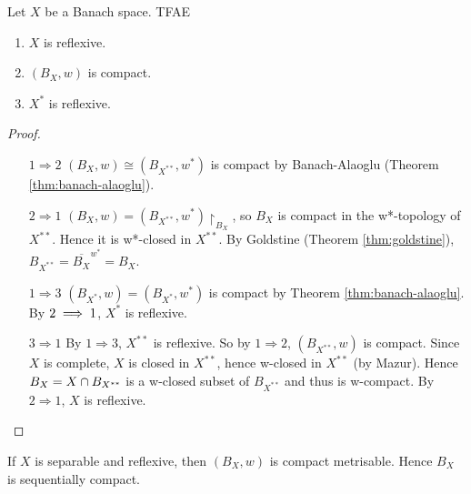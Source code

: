 \documentclass{article}
\begin{document}
\begin{nthm}
  Let $X$ be a Banach space. TFAE
  \begin{enumerate}
    \item $X$ is reflexive.
    \item $(B_X, w)$ is compact.
    \item $X^*$ is reflexive.
  \end{enumerate}
\end{nthm}
\begin{proof}~
  \begin{itemize}
    \item[$1 \Rightarrow 2$] $(B_X, w) \cong (B_{X^{**}}, w^*)$ is compact by Banach-Alaoglu (Theorem \ref{thm:banach-alaoglu}).
    \item[$2 \Rightarrow 1$] $(B_X, w) = (B_{X^{**}}, w^*)\restriction_{B_X}$, so $B_X$ is compact in the w*-topology of $X^{**}$. Hence it is w*-closed in $X^{**}$. By Goldstine (Theorem \ref{thm:goldstine}), $B_{X^{**}} = \overline{B_X}^{w^*} = B_X$.
    \item[$1 \Rightarrow 3$] $(B_{X^*}, w) = (B_{X^*}, w^*)$ is compact by Theorem \ref{thm:banach-alaoglu}. By $2 \implies 1$, $X^*$ is reflexive.
    \item[$3 \Rightarrow 1$] By $1 \Rightarrow 3$, $X^{**}$ is reflexive. So by $1 \Rightarrow 2$, $(B_{X^{**}}, w)$ is compact. Since $X$ is complete, $X$ is closed in $X^{**}$, hence w-closed in $X^{**}$ (by Mazur). Hence $B_X = X \cap B_{X^{**}}$ is a w-closed subset of $B_{X^{**}}$ and thus is w-compact. By $2 \Rightarrow 1$, $X$ is reflexive.
  \end{itemize}
\end{proof}

\begin{rmk}
  If $X$ is separable and reflexive, then $(B_X, w)$ is compact metrisable. Hence $B_X$ is sequentially compact.
\end{rmk}
\end{document}
